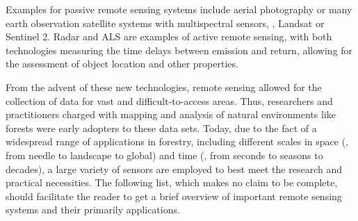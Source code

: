 Examples for passive remote sensing systems include aerial photography or many earth observation satellite systems 
with multispectral sensors, \eg, Landsat or Sentinel 2. 
Radar and \ac{ALS} are examples of active remote sensing, with both technologies measuring the time delays between emission and return, 
allowing for the assessment of object location and other properties. 

From the advent of these new technologies, remote sensing allowed for the collection of data for vast and difficult-to-access areas. 
Thus, researchers and practitioners charged with mapping and analysis of natural environments like forests were early adopters to these data sets.
Today,  
due to the fact of a widespread range of applications in forestry, including different scales in space (\ie, from needle to landscape to global) 
and time (\ie, from seconds to seasons to decades), a large variety of sensors are employed to best meet the research and practical necessities. 
The following list, which makes no claim to be complete, should facilitate the reader to get a brief overview
of important remote sensing systems and their primarily applications.  

